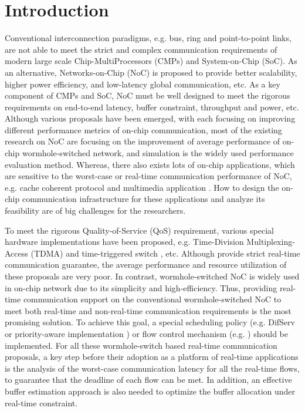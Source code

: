\documentclass[10pt,journal]{IEEEtran}
\begin{document}
\section{Introduction}
Conventional interconnection paradigms, e.g. bus, ring and point-to-point links, are not able to meet the strict and complex communication requirements of modern large scale Chip-MultiProcessors (CMPs) and System-on-Chip (SoC). As an alternative, Networks-on-Chip (NoC) is proposed to provide better scalability, higher power efficiency, and low-latency global communication, etc. As a key component of CMPs and SoC, NoC must be well designed to meet the rigorous requirements on end-to-end latency, buffer constraint, throughput and power, etc. Although various proposals have been emerged, with each focusing on improving different performance metrics of on-chip communication, most of the existing research on NoC are focusing on the improvement of average performance of on-chip wormhole-switched network, and simulation is the widely used performance evaluation method. Whereas, there also exists lots of on-chip applications, which are sensitive to the worst-case or real-time communication performance of NoC, e.g. cache coherent protocol \cite{Bolotin2007} and multimedia application \cite{ostermann2004video}. How to design the on-chip communication infrastructure for these applications and analyze its feasibility are of big challenges for the researchers.

To meet the rigorous Quality-of-Service (QoS) requirement, various special hardware implementations have been proposed, e.g. Time-Division Multiplexing-Access (TDMA) \cite{GoDR05} and time-triggered switch \cite{4617280}, etc. Although provide strict real-time communication guarantee, the average performance and resource utilization of these proposals are very poor. In contrast, wormhole-switched NoC is widely used in on-chip network due to its simplicity and high-efficiency. Thus, providing real-time communication support on the conventional wormhole-switched NoC to meet both real-time and non-real-time communication requirements is the most promising solution. To achieve this goal, a special scheduling policy (e.g. DifServ \cite{1411140} or priority-aware implementation \cite{Shi:2008:RCA:1397757.1397996}\cite{708526}\cite{627905}) or flow control mechanism (e.g. \cite{Li199649}\cite{707545}) should be implemented. For all these wormhole-switch based real-time communication proposals, a key step before their adoption as a platform of real-time applications is the analysis of the worst-case communication latency for all the real-time flows, to guarantee that the deadline of each flow can be met. In addition, an effective buffer estimation approach is also needed to optimize the buffer allocation under real-time constraint.
\end{document}
